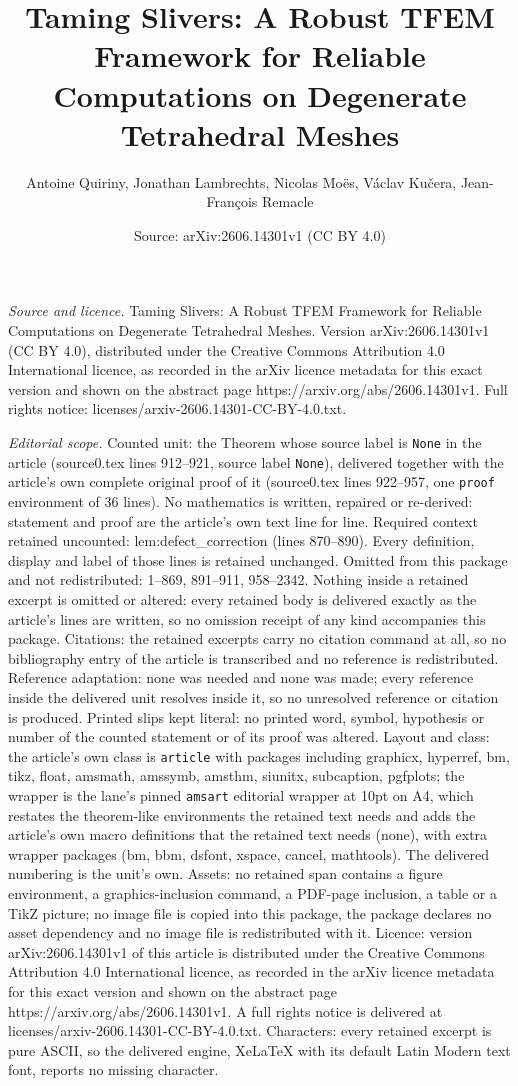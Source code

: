 \documentclass[10pt,a4paper]{amsart}
\title[Taming Slivers: A Robust TFEM Framework for Reliable Computa]{Taming Slivers: A Robust TFEM Framework for Reliable Computations on Degenerate Tetrahedral Meshes}
\author{Antoine Quiriny, Jonathan Lambrechts, Nicolas Mo\"es, V\'aclav Ku\v{c}era, Jean-Fran\c{c}ois Remacle}
\date{Source: arXiv:2606.14301v1 (CC BY 4.0)}
\begin{document}
\maketitle

\noindent\emph{Source and licence.} Taming Slivers: A Robust TFEM Framework for Reliable Computations on Degenerate Tetrahedral Meshes. Version arXiv:2606.14301v1 (CC BY 4.0), distributed under the Creative Commons Attribution 4.0 International licence, as recorded in the arXiv licence metadata for this exact version and shown on the abstract page https://arxiv.org/abs/2606.14301v1. Full rights notice: licenses/arxiv-2606.14301-CC-BY-4.0.txt.\par\smallskip

\noindent\textit{Editorial scope.} Counted unit: the Theorem whose source label is \texttt{None} in the article (source0.tex lines 912--921, source label \texttt{None}), delivered together with the article's own complete original proof of it (source0.tex lines 922--957, one \texttt{proof} environment of 36 lines). No mathematics is written, repaired or re-derived: statement and proof are the article's own text line for line. Required context retained uncounted: lem:defect\_correction (lines 870--890). Every definition, display and label of those lines is retained unchanged. Omitted from this package and not redistributed: 1--869, 891--911, 958--2342. Nothing inside a retained excerpt is omitted or altered: every retained body is delivered exactly as the article's lines are written, so no omission receipt of any kind accompanies this package. Citations: the retained excerpts carry no citation command at all, so no bibliography entry of the article is transcribed and no reference is redistributed. Reference adaptation: none was needed and none was made; every reference inside the delivered unit resolves inside it, so no unresolved reference or citation is produced. Printed slips kept literal: no printed word, symbol, hypothesis or number of the counted statement or of its proof was altered. Layout and class: the article's own class is \texttt{article} with packages including graphicx, hyperref, bm, tikz, float, amsmath, amssymb, amsthm, siunitx, subcaption, pgfplots; the wrapper is the lane's pinned \texttt{amsart} editorial wrapper at 10pt on A4, which restates the theorem-like environments the retained text needs and adds the article's own macro definitions that the retained text needs (none), with extra wrapper packages (bm, bbm, dsfont, xspace, cancel, mathtools). The delivered numbering is the unit's own. Assets: no retained span contains a figure environment, a graphics-inclusion command, a PDF-page inclusion, a table or a TikZ picture; no image file is copied into this package, the package declares no asset dependency and no image file is redistributed with it. Licence: version arXiv:2606.14301v1 of this article is distributed under the Creative Commons Attribution 4.0 International licence, as recorded in the arXiv licence metadata for this exact version and shown on the abstract page https://arxiv.org/abs/2606.14301v1. A full rights notice is delivered at licenses/arxiv-2606.14301-CC-BY-4.0.txt. Characters: every retained excerpt is pure ASCII, so the delivered engine, XeLaTeX with its default Latin Modern text font, reports no missing character.
\end{document}
